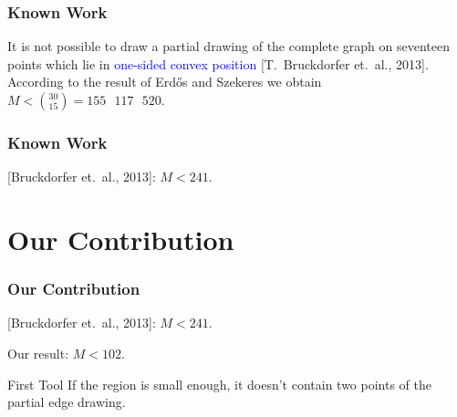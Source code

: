 \documentclass{beamer}
\begin{document}
\begin{frame}
\frametitle{Known Work}
It is not possible to draw a partial drawing of the complete graph on
seventeen points which lie in \textcolor{blue}{one-sided convex position} [T.\ Bruckdorfer et.\ al., 2013]. According to the result of Erd\H{o}s and Szekeres we obtain $M < \binom{30}{15} = 155\text{ }117\text{ }520$.

\begin{figure}[H]
\centering
\resizebox{6cm}{!}{%

}
\end{figure}

\begin{figure}[H]
\centering

\end{figure}
\end{frame}

\begin{frame}
\frametitle{Known Work}
[Bruckdorfer et.\ al., 2013]: $M < 241$.
\begin{figure}[H]
\centering

\end{figure}
\vspace{2.7cm}
\end{frame}

\section{Our Contribution}
\begin{frame}
\frametitle{Our Contribution}
[Bruckdorfer et.\ al., 2013]: $M < 241$.
\begin{figure}[H]
\centering

\end{figure}
Our result: $M < 102$.
\begin{figure}[H]
\centering

\end{figure}
\end{frame}

\begin{frame}
\begin{block}{First Tool}
If the region is small enough, it doesn’t contain two points of the partial
edge drawing.
\end{block}
\begin{figure}
\centering
\resizebox{8cm}{!}{%

}
\end{figure}
\end{frame}
\end{document}
